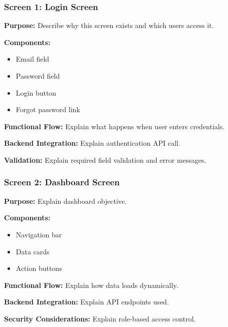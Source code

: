 
\subsubsection{Screen 1: Login Screen}

\textbf{Purpose:}  
Describe why this screen exists and which users access it.

\textbf{Components:}
\begin{itemize}
    \item Email field
    \item Password field
    \item Login button
    \item Forgot password link
\end{itemize}

\textbf{Functional Flow:}
Explain what happens when user enters credentials.

\textbf{Backend Integration:}
Explain authentication API call.

\textbf{Validation:}
Explain required field validation and error messages.



\subsubsection{Screen 2: Dashboard Screen}

\textbf{Purpose:}  
Explain dashboard objective.

\textbf{Components:}
\begin{itemize}
    \item Navigation bar
    \item Data cards
    \item Action buttons
\end{itemize}

\textbf{Functional Flow:}
Explain how data loads dynamically.

\textbf{Backend Integration:}
Explain API endpoints used.

\textbf{Security Considerations:}
Explain role-based access control.

